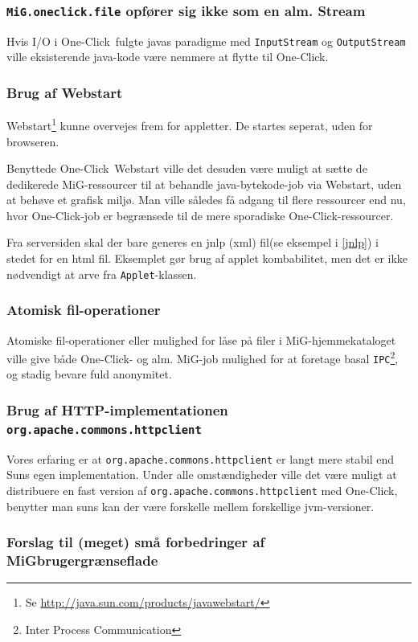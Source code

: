 \documentclass[draft,a4paper,11pt]{article}
\newcommand{\mig}{MiG}
\newcommand{\oc}{One-Click}
\begin{document}
\subsubsection*{\texttt{MiG.oneclick.file} opfører sig ikke som en alm. Stream} 
Hvis I/O i \oc\ fulgte javas paradigme med \texttt{InputStream} og \texttt{OutputStream} ville eksisterende java-kode være nemmere at flytte til \oc.

\subsubsection*{Brug af Webstart}
Webstart\footnote{Se \url{http://java.sun.com/products/javawebstart/}} kunne overvejes frem for appletter. De startes seperat, uden for browseren. 

Benyttede \oc\ Webstart ville det desuden være muligt at sætte de dedikerede \mig-ressourcer til at behandle java-bytekode-job via Webstart, uden at behøve et grafisk miljø. Man ville således få adgang til flere ressourcer end nu, hvor \oc-job er begrænsede til de mere sporadiske \oc-ressourcer.   

Fra serversiden skal der bare generes en jnlp (xml) fil(se eksempel i \ref{jnlp}) i stedet for en html fil. Eksemplet gør brug af applet kombabilitet, men det er ikke nødvendigt at arve fra \texttt{Applet}-klassen.

\subsubsection*{Atomisk fil-operationer}
Atomiske fil-operationer eller mulighed for låse på filer i \mig-hjemmekataloget ville give både \oc- og alm. \mig-job mulighed for at foretage basal \texttt{IPC}\footnote{Inter Process Communication}, og stadig bevare fuld anonymitet. 

\subsubsection*{Brug af HTTP-implementationen \texttt{org.apache.commons.httpclient}}
Vores erfaring er at \texttt{org.apache.commons.httpclient} er langt mere stabil end Suns egen implementation. Under alle omstændigheder ville det være muligt at distribuere en fast version af \texttt{org.apache.commons.httpclient} med \oc, benytter man suns kan der være forskelle mellem forskellige jvm-versioner.

\subsubsection*{Forslag til (meget) små forbedringer af \mig brugergrænseflade}
\end{document}

